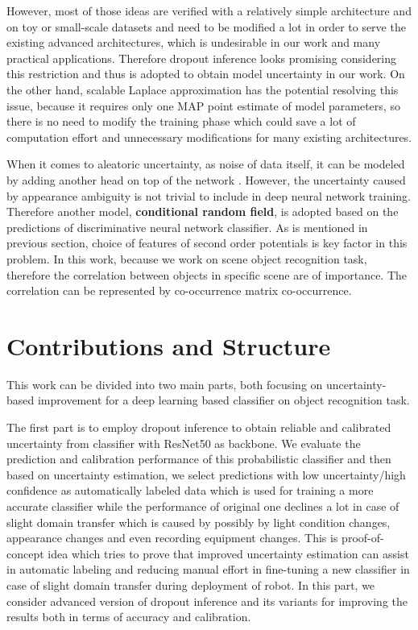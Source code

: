 However, most of those ideas are verified with a relatively simple architecture and on toy or small-scale datasets and need to be modified a lot in order to serve the existing advanced architectures, which is undesirable in our work and many practical applications. Therefore dropout inference\cite{gal2016dropout} looks promising considering this restriction and thus is adopted to obtain model uncertainty in our work. On the other hand, scalable Laplace approximation \cite{ritter2018scalable} has the potential resolving this issue, because it requires only one MAP point estimate of model parameters, so there is no need to modify the training phase which could save a lot of computation effort and unnecessary modifications for many existing architectures.

When it comes to aleatoric uncertainty, as noise of data itself, it can be modeled by adding another head on top of the network \cite{kendall2017uncertainties}. However, the uncertainty caused by appearance ambiguity is not trivial to include in deep neural network training. Therefore another model, \textbf{conditional random field}\cite{lafferty2001conditional}, is adopted based on the predictions of discriminative neural network classifier. As is mentioned in previous section, choice of features of second order potentials is key factor in this problem. In this work, because we work on scene object recognition task, therefore the correlation between objects in specific scene are of importance. The correlation can be represented by co-occurrence matrix co-occurrence\cite{ladicky2010graph}\cite{rasiwasia2009holistic}\cite{galleguillos2008object}\cite{rabinovich2007objects}.

\section{Contributions and Structure}
This work can be divided into two main parts, both focusing on uncertainty-based improvement for a deep learning based classifier on object recognition task. 

The first part is to employ dropout inference to obtain reliable and calibrated uncertainty from classifier with ResNet50\cite{he2016deep} as backbone. We evaluate the prediction and calibration performance of this probabilistic classifier and then based on uncertainty estimation, we select predictions with low uncertainty/high confidence as automatically labeled data which is used for training a more accurate classifier while the performance of original one declines a lot in case of slight domain transfer which is caused by possibly by light condition changes, appearance changes and even recording equipment changes. This is proof-of-concept idea which tries to prove that improved uncertainty estimation can assist in automatic labeling and reducing manual effort in fine-tuning a new classifier in case of slight domain transfer during deployment of robot. In this part, we consider advanced version of dropout inference and its variants for improving the results both in terms of accuracy and calibration. 

